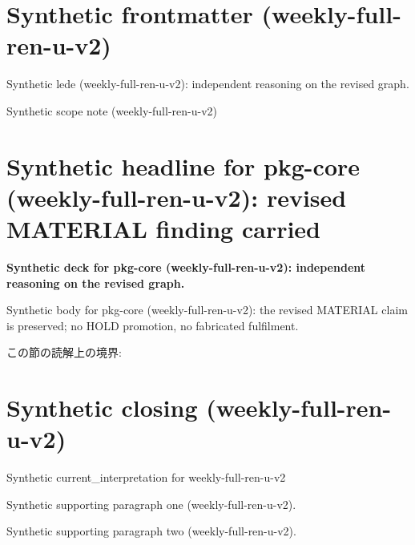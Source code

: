 \documentclass[lualatex,a4paper,10pt]{jlreq}
\begin{document}
\surveycover
\clearpage
\section*{Synthetic frontmatter (weekly-full-ren-u-v2)}
Synthetic lede (weekly-full-ren-u-v2): independent reasoning on the revised graph.

\begin{claimboundary}
\noindent Synthetic scope note (weekly-full-ren-u-v2)\par
\end{claimboundary}
\clearpage
\twocolumn
\section{Synthetic headline for pkg-core (weekly-full-ren-u-v2): revised MATERIAL finding carried}
\label{pkg:pkg-core}
\noindent\textbf{Synthetic deck for pkg-core (weekly-full-ren-u-v2): independent reasoning on the revised graph.} \cite{w2026-W33target-source}\par\medskip
\noindent Synthetic body for pkg-core (weekly-full-ren-u-v2): the revised MATERIAL claim is preserved; no HOLD promotion, no fabricated fulfilment.\par\medskip
\begin{claimboundary}
この節の読解上の境界: 
\end{claimboundary}
\clearpage
\onecolumn
\section{Synthetic closing (weekly-full-ren-u-v2)}
\label{sec:issue-summary}
\noindent Synthetic current\_interpretation for weekly-full-ren-u-v2\par\medskip
\noindent Synthetic supporting paragraph one (weekly-full-ren-u-v2).\par\medskip
\noindent Synthetic supporting paragraph two (weekly-full-ren-u-v2).\par\medskip
\clearpage
\onecolumn
\printbibliography[title={References / Source Notes}]
\end{document}
